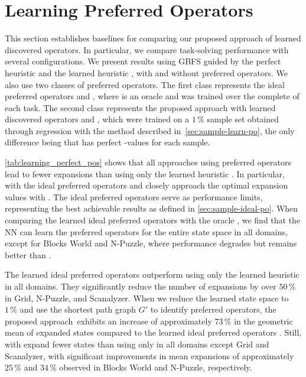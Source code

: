 \documentclass[ppgc,diss,english]{iiufrgs}
\begin{document}
\section{Learning Preferred Operators}
\label{sec:exp-learning-po}
This section establishes baselines for comparing our proposed approach of learned discovered operators. In particular, we compare task-solving performance with several configurations. We present results using GBFS guided by the perfect heuristic \hstar and the learned heuristic \hnn, with and without preferred operators. We also use two classes of preferred operators. The first class represents the ideal preferred operators \postartable and \postar, where \postartable is an oracle and \postar was trained over the complete \fsp of each task. The second class represents the proposed approach with learned discovered operators \pogstar and \pog, which were trained on a $1\,\%$ sample set obtained through regression with the method described in~\cref{sec:sample-learn-po}, the only difference being that \pogstar has perfect \hstar-values for each sample.



\cref{tab:learning_perfect_pos} shows that all approaches using preferred operators lead to fewer expansions than using only the learned heuristic \hnn. In particular, \hnn with the ideal preferred operators \postartable and \postar closely approach the optimal expansion values with \hstar.
The ideal preferred operators serve as performance limits, representing the best achievable results as defined in \cref{sec:sample-ideal-po}. When comparing the learned ideal preferred operators \postar with the oracle \postartable, we find that the NN can learn the preferred operators for the entire state space in all domains, except for Blocks World and N-Puzzle, where performance degrades but remains better than \hnn.

The learned ideal preferred operators \postar outperform using only the learned heuristic \hnn in all domains. They significantly reduce the number of expansions by over $50\,\%$ in Grid, N-Puzzle, and Scanalyzer. When we reduce the learned state space to $1\,\%$ and use the shortest path graph $G'$ to identify preferred operators, the proposed approach~\pog exhibits an increase of approximately $73\,\%$ in the geometric mean of expanded states compared to the learned ideal preferred operators \postar. Still, \hnn with \pog expand fewer states than using only \hnn in all domains except Grid and Scanalyzer, with significant improvements in mean expansions of approximately $25\,\%$ and $34\,\%$ observed in Blocks World and N-Puzzle, respectively.
\end{document}
